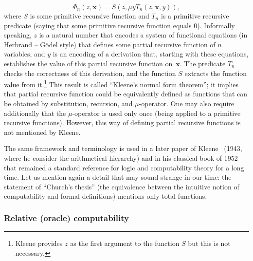 \documentclass[12pt]{article}
\theoremstyle{remark}
\begin{document}
  \[
\Phi_n (z,\mathbf{x})= S(z,\mu y T_n(z,\mathbf{x},y)),
  \]
where $S$ is some primitive recursive function and $T_n$ is a primitive recursive predicate (saying that some primitive recursive function equals $0$). Informally speaking, $z$ is a natural number that encodes a system of functional equations (in Herbrand -- G\"odel style) that defines some partial recursive  function of $n$ variables, and $y$ is an encoding of a derivation that, starting with these equations, establishes the value of this partial recursive function on~$\mathbf{x}$. The predicate $T_n$ checks the correctness of this derivation, and the function $S$ extracts the function value from it.\footnote{Kleene provides $z$ as the first argument to the function $S$ but this is not necessary.} This result is called ``Kleene's normal form theorem''; it implies that partial recursive function could be equivalently defined as functions that can be obtained by substitution, recursion, and $\mu$-operator. One may also require additionally that the $\mu$-operator is used only once (being applied to a primitive recursive functions). However, this way of defining partial recursive functions is not mentioned by Kleene.

The same framework and terminology is used in a later paper of Kleene~\cite{Kleene1943} (1943, where he consider the arithmetical hierarchy) and in his classical book of 1952~\cite{Kleene1957} that remained a standard reference for logic and computability theory for a long time. Let us mention again a detail that may sound strange in our time: the statement of ``Church's thesis'' (the equivalence between the intuitive notion of computability and formal definitions) mentions only total functions.

\subsubsection*{Relative (oracle) computability}
\end{document}
